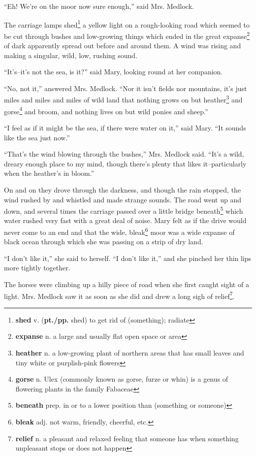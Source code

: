 ``Eh! We're on the moor now sure enough,'' said Mrs. Medlock.

The carriage lamps shed\footnote{\textbf{shed} v. (\textbf{pt./pp.} shed) to get rid of (something); radiate} a yellow light on a rough-looking road which seemed to be cut through bushes and low-growing things which ended in the great expanse\footnote{\textbf{expanse} n. a large and usually flat open space or area} of dark apparently spread out before and around them. A wind was rising and making a singular, wild, low, rushing sound.

``It's--it's not the sea, is it?'' said Mary, looking round at her companion.

``No, not it,'' answered Mrs. Medlock. ``Nor it isn't fields nor mountains, it's just miles and miles and miles of wild land that nothing grows on but heather\footnote{\textbf{heather} n. a low-growing plant of northern areas that has small leaves and tiny white or purplish-pink flowers} and gorse\footnote{\textbf{gorse} n. Ulex (commonly known as gorse, furze or whin) is a genus of flowering plants in the family Fabaceae} and broom, and nothing lives on but wild ponies and sheep.''

``I feel as if it might be the sea, if there were water on it,'' said Mary. ``It sounds like the sea just now.''

``That's the wind blowing through the bushes,'' Mrs. Medlock said. ``It's a wild, dreary enough place to my mind, though there's plenty that likes it--particularly when the heather's in bloom.''

On and on they drove through the darkness, and though the rain stopped, the wind rushed by and whistled and made strange sounds. The road went up and down, and several times the carriage passed over a little bridge beneath\footnote{\textbf{beneath} prep. in or to a lower position than (something or someone)} which water rushed very fast with a great deal of noise. Mary felt as if the drive would never come to an end and that the wide, bleak\footnote{\textbf{bleak} adj. not warm, friendly, cheerful, etc.} moor was a wide expanse of black ocean through which she was passing on a strip of dry land.

``I don't like it,'' she said to herself. ``I don't like it,'' and she pinched her thin lips more tightly together.

The horses were climbing up a hilly piece of road when she first caught sight of a light. Mrs. Medlock saw it as soon as she did and drew a long sigh of relief\footnote{\textbf{relief} n. a pleasant and relaxed feeling that someone has when something unpleasant stops or does not happen}.

